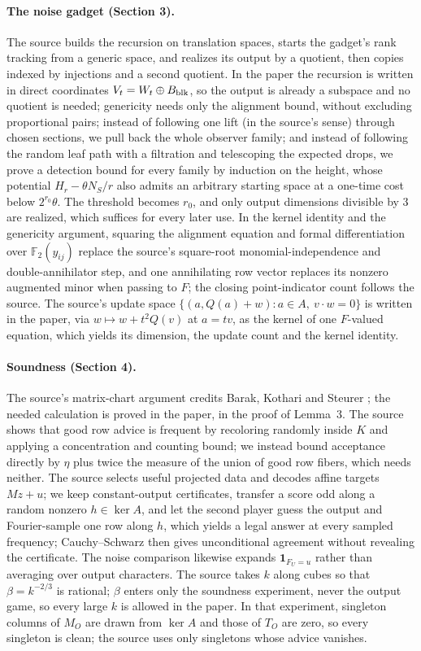 \documentclass[11pt]{article}
\newcommand{\F}{\mathbb F}
\newcommand{\ind}{\mathbf 1}
\begin{document}
\paragraph{The noise gadget (Section 3).}
The source builds the recursion on translation spaces, starts the
gadget's rank tracking from a generic space, and realizes its output by a
quotient, then copies indexed by injections and a second quotient. In the
paper the recursion is written in direct coordinates
$V_t=W_t\oplus B_{\rm blk}$, so the output is already a subspace and no
quotient is needed; genericity needs only the alignment bound, without
excluding proportional pairs; instead of following one lift (in the
source's sense) through chosen sections, we pull back the whole observer
family; and instead of following the random leaf path with a filtration
and telescoping the expected drops, we prove a detection bound for every
family by induction on the height, whose potential $H_r-\theta N_S/r$ also
admits an arbitrary starting space at a one-time cost below
$2^{r_0}\theta$. The threshold becomes $r_0$, and only output dimensions
divisible by $3$ are realized, which suffices for every later use. In the
kernel identity and the genericity argument, squaring the alignment
equation and formal differentiation over $\F_2(y_{ij})$ replace the
source's square-root monomial-independence and double-annihilator step,
and one annihilating row vector replaces its nonzero augmented minor when
passing to $F$; the closing point-indicator count follows the source. The
source's update space $\{(a,Q(a)+w):a\in A,\ v\cdot w=0\}$ is written in
the paper, via $w\mapsto w+t^2Q(v)$ at $a=tv$, as the kernel of one
$F$-valued equation, which yields its dimension, the update count and the
kernel identity.

\paragraph{Soundness (Section 4).}
The source's matrix-chart argument credits Barak, Kothari and Steurer
\cite{BKS}; the needed calculation is proved in the paper, in the proof
of Lemma~3. The source shows that good row advice is frequent by
recoloring randomly inside $K$ and applying a concentration and counting
bound; we instead bound acceptance directly by $\eta$ plus twice the
measure of the union of good row fibers, which needs neither. The source
selects useful projected data and decodes affine targets $Mz+u$; we keep
constant-output certificates, transfer a score odd along a random nonzero
$h\in\ker A$, and let the second player guess the output and
Fourier-sample one row along $h$, which yields a legal answer at every
sampled frequency; Cauchy--Schwarz then gives unconditional agreement
without revealing the certificate. The noise comparison likewise expands
$\ind_{F_U=u}$ rather than averaging over output characters. The source
takes $k$ along cubes so that $\beta=k^{-2/3}$ is rational; $\beta$ enters
only the soundness experiment, never the output game, so every large $k$
is allowed in the paper. In that experiment, singleton columns of $M_O$
are drawn from $\ker A$ and those of $T_O$ are zero, so every singleton is
clean; the source uses only singletons whose advice vanishes.
\end{document}
